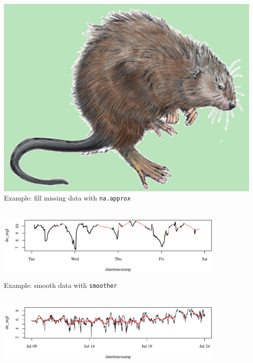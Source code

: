 \documentclass[serif]{beamer}\usepackage[]{graphicx}\usepackage[]{color}
\newenvironment{knitrout}{}{} %
\begin{document}
\begin{frame}[fragile]{\includegraphics[width=0.05\paperwidth]{fig/muskrat.png}\hspace{0.07in}{\bf SWMPrats.net: The SWMPr package}}
Example: fill missing data with \texttt{na.approx} \\~\\
\begin{knitrout}\scriptsize
{}\color{fgcolor}

{\centering \includegraphics[width=0.85\textwidth]{fig//filled-1} 

}



\end{knitrout}
Example: smooth data with \texttt{smoother} \\~\\
\begin{knitrout}\scriptsize
{}\color{fgcolor}

{\centering \includegraphics[width=0.85\textwidth]{fig//smooth-1} 

}



\end{knitrout}
\end{frame}
\end{document}
